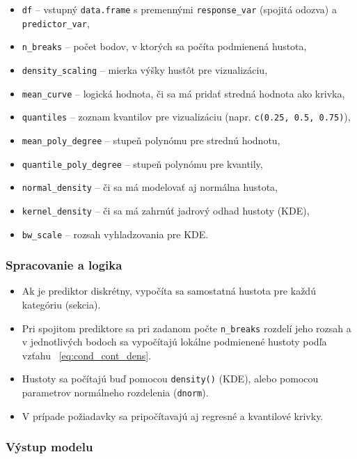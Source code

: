 \begin{itemize}
\setlength{\itemsep}{0pt}
  \setlength{\parskip}{0pt}
  \item \texttt{df} – vstupný \texttt{data.frame} s premennými \texttt{response\_var} (spojitá odozva) a \texttt{predictor\_var},
  \item \texttt{n\_breaks} – počet bodov, v ktorých sa počíta podmienená hustota,
  \item \texttt{density\_scaling} – mierka výšky hustôt pre vizualizáciu,
  \item \texttt{mean\_curve} – logická hodnota, či sa má pridať stredná hodnota ako krivka,
  \item \texttt{quantiles} – zoznam kvantilov pre vizualizáciu (napr. \texttt{c(0.25, 0.5, 0.75)}),
  \item \texttt{mean\_poly\_degree} – stupeň polynómu pre strednú hodnotu,
  \item \texttt{quantile\_poly\_degree} – stupeň polynómu pre kvantily,
  \item \texttt{normal\_density} – či sa má modelovať aj normálna hustota,
  \item \texttt{kernel\_density} – či sa má zahrnúť jadrový odhad hustoty (KDE),
  \item \texttt{bw\_scale} – rozsah vyhladzovania pre KDE.
\end{itemize}

\subsubsection{Spracovanie a logika}

\begin{itemize}
\setlength{\itemsep}{0pt}
  \setlength{\parskip}{0pt}
  \item Ak je prediktor diskrétny, vypočíta sa samostatná hustota pre každú kategóriu (sekcia).
  \item Pri spojitom prediktore sa pri zadanom počte \texttt{n\_breaks} rozdelí jeho rozsah a v jednotlivých bodoch sa vypočítajú lokálne podmienené hustoty podľa vzťahu ~\ref{eq:cond_cont_dens}.
  \item Hustoty sa počítajú buď pomocou \texttt{density()} (KDE), alebo pomocou parametrov normálneho rozdelenia (\texttt{dnorm}).
  \item V prípade požiadavky sa pripočítavajú aj regresné a kvantilové krivky.
\end{itemize}

\subsubsection{Výstup modelu}

